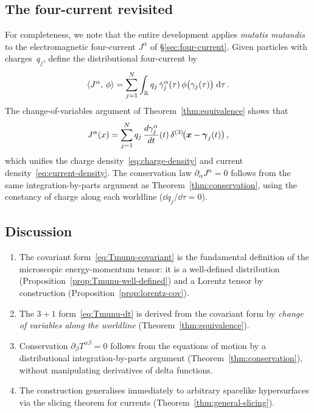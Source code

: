 \subsection{The four-current revisited}\label{sec:four-current-add}

For completeness, we note that the entire development applies
\emph{mutatis mutandis} to the electromagnetic four-current
$J^\alpha$ of \S\ref{sec:four-current}.  Given particles with
charges~$q_j$, define the distributional four-current by
\begin{equation}\label{eq:Jmu-dist}
  \langle J^\alpha,\,\phi\rangle
    = \sum_{j=1}^{N} \int_{\mathbb{R}} q_j\,
      \dot\gamma_j^\alpha(\tau)\,
      \phi\bigl(\gamma_j(\tau)\bigr)\;\mathrm{d}\tau\,.
\end{equation}
The change-of-variables argument of Theorem~\ref{thm:equivalence} shows that
\begin{equation}\label{eq:Jmu-31}
  J^\alpha(x) = \sum_{j=1}^{N} q_j\,
    \frac{d\gamma_j^\alpha}{dt}(t)\,
    \delta^{(3)}\!\bigl(\boldsymbol{x} - \boldsymbol{\gamma}_j(t)\bigr)\,,
\end{equation}
which unifies the charge density~\eqref{eq:charge-density} and
current density~\eqref{eq:current-density}.  The conservation law
$\partial_\alpha J^\alpha = 0$ follows from the same
integration-by-parts argument as
Theorem~\ref{thm:conservation}, using the constancy of charge
along each worldline ($\dd q_j/\dd\tau = 0$).

\subsection{Discussion}\label{sec:emt-discussion}

\begin{keyresult}[Summary]
  \begin{enumerate}
    \item[\textup{(i)}] The covariant
      form~\eqref{eq:Tmunu-covariant} is the fundamental
      definition of the microscopic energy-momentum tensor: it is a
      well-defined distribution
      (Proposition~\ref{prop:Tmunu-well-defined}) and a Lorentz
      tensor by construction
      (Proposition~\ref{prop:lorentz-cov}).
    \item[\textup{(ii)}] The $3{+}1$ form~\eqref{eq:Tmunu-dt} is
      derived from the covariant form by \emph{change of variables
      along the worldline} (Theorem~\ref{thm:equivalence}).
    \item[\textup{(iii)}] Conservation
      $\partial_\beta T^{\alpha\beta} = 0$ follows from the
      equations of motion by a distributional
      integration-by-parts argument
      (Theorem~\ref{thm:conservation}), without manipulating
      derivatives of delta functions.
    \item[\textup{(iv)}] The construction generalises immediately
      to arbitrary spacelike hypersurfaces via the slicing
      theorem for currents
      (Theorem~\ref{thm:general-slicing}).
  \end{enumerate}
\end{keyresult}

